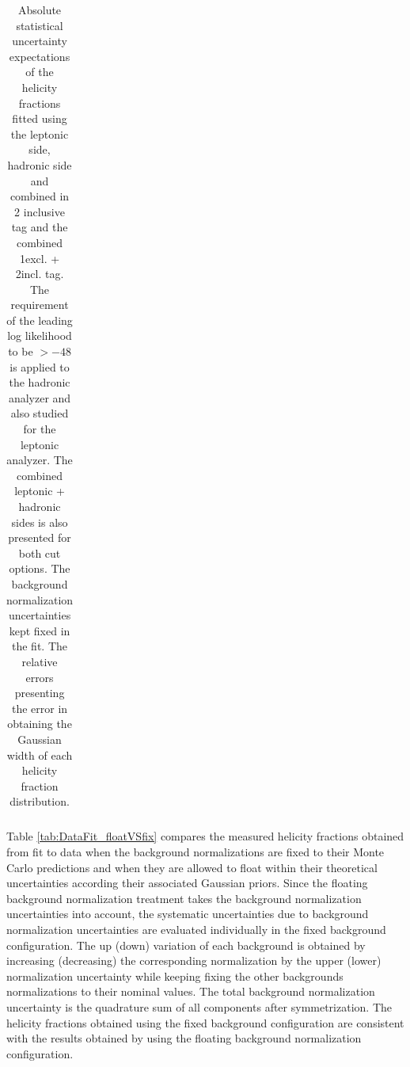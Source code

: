 \begin{table}[]
\begin{tabular}{c|c|c|c}
\hline
\end{tabular}
\caption{Absolute statistical uncertainty expectations of the helicity fractions fitted using the leptonic side, hadronic side and combined in 2 inclusive \bt tag and the combined 1excl. + 2incl. \bt tag. The requirement of the leading log likelihood to be $>-48$ is applied to the hadronic analyzer and also studied for the leptonic analyzer. The combined leptonic + hadronic sides is also presented for both cut options. The background normalization uncertainties kept fixed in the fit. The relative errors presenting the error in obtaining the Gaussian width  of each helicity fraction distribution.  %
}
\label{tab:statUnc_fix_LH_comparison}
\end{table}


Table \ref{tab:DataFit_floatVSfix} compares the measured helicity fractions obtained from fit to data when the background normalizations are fixed to their Monte Carlo predictions and when they are allowed to float within their theoretical uncertainties according their associated Gaussian priors. Since the floating background normalization treatment takes the background normalization uncertainties into account, the systematic uncertainties due to background normalization uncertainties are evaluated individually in the fixed background configuration. The up (down) variation of each background is obtained by increasing (decreasing) the corresponding normalization by the upper (lower) normalization uncertainty while keeping fixing the other backgrounds normalizations to their nominal values. The total background normalization uncertainty is the quadrature sum of all components after symmetrization. The helicity fractions obtained using the fixed background configuration are consistent with the results obtained by using the floating background normalization configuration. %


